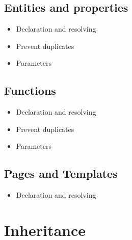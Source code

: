     \subsection{Entities and properties}

      \begin{itemize}
        \item Declaration and resolving
        \item Prevent duplicates
        \item Parameters
      \end{itemize}

    \subsection{Functions}

      \begin{itemize}
        \item Declaration and resolving
        \item Prevent duplicates
        \item Parameters
      \end{itemize}

    \subsection{Pages and Templates}

      \begin{itemize}
        \item Declaration and resolving
      \end{itemize}

  \section{Inheritance}

